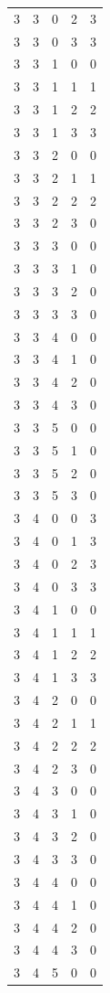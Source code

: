 \begin{longtable}{rrrrr}
3 & 3 & 0 & 2 & 3 \\
3 & 3 & 0 & 3 & 3 \\
3 & 3 & 1 & 0 & 0 \\
3 & 3 & 1 & 1 & 1 \\
3 & 3 & 1 & 2 & 2 \\
3 & 3 & 1 & 3 & 3 \\
3 & 3 & 2 & 0 & 0 \\
3 & 3 & 2 & 1 & 1 \\
3 & 3 & 2 & 2 & 2 \\
3 & 3 & 2 & 3 & 0 \\
3 & 3 & 3 & 0 & 0 \\
3 & 3 & 3 & 1 & 0 \\
3 & 3 & 3 & 2 & 0 \\
3 & 3 & 3 & 3 & 0 \\
3 & 3 & 4 & 0 & 0 \\
3 & 3 & 4 & 1 & 0 \\
3 & 3 & 4 & 2 & 0 \\
3 & 3 & 4 & 3 & 0 \\
3 & 3 & 5 & 0 & 0 \\
3 & 3 & 5 & 1 & 0 \\
3 & 3 & 5 & 2 & 0 \\
3 & 3 & 5 & 3 & 0 \\
3 & 4 & 0 & 0 & 3 \\
3 & 4 & 0 & 1 & 3 \\
3 & 4 & 0 & 2 & 3 \\
3 & 4 & 0 & 3 & 3 \\
3 & 4 & 1 & 0 & 0 \\
3 & 4 & 1 & 1 & 1 \\
3 & 4 & 1 & 2 & 2 \\
3 & 4 & 1 & 3 & 3 \\
3 & 4 & 2 & 0 & 0 \\
3 & 4 & 2 & 1 & 1 \\
3 & 4 & 2 & 2 & 2 \\
3 & 4 & 2 & 3 & 0 \\
3 & 4 & 3 & 0 & 0 \\
3 & 4 & 3 & 1 & 0 \\
3 & 4 & 3 & 2 & 0 \\
3 & 4 & 3 & 3 & 0 \\
3 & 4 & 4 & 0 & 0 \\
3 & 4 & 4 & 1 & 0 \\
3 & 4 & 4 & 2 & 0 \\
3 & 4 & 4 & 3 & 0 \\
3 & 4 & 5 & 0 & 0 \\

\end{longtable}
